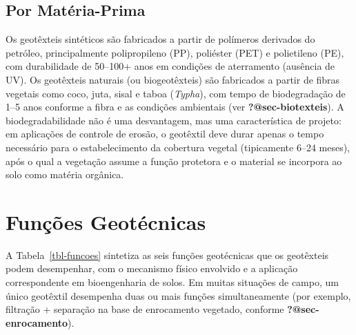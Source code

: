 \documentclass[
  portuguese,
  11pt,
  a4paper,
  open=any]{scrbook}
\begin{document}
\subsection{Por Matéria-Prima}\label{por-matuxe9ria-prima}

Os geotêxteis sintéticos são fabricados a partir de polímeros derivados
do petróleo, principalmente polipropileno (PP), poliéster (PET) e
polietileno (PE), com durabilidade de 50--100+ anos em condições de
aterramento (ausência de UV). Os geotêxteis naturais (ou biogeotêxteis)
são fabricados a partir de fibras vegetais como coco, juta, sisal e
taboa (\emph{Typha}), com tempo de biodegradação de 1--5 anos conforme a
fibra e as condições ambientais (ver \textbf{?@sec-biotexteis}). A
biodegradabilidade não é uma desvantagem, mas uma característica de
projeto: em aplicações de controle de erosão, o geotêxtil deve durar
apenas o tempo necessário para o estabelecimento da cobertura vegetal
(tipicamente 6--24 meses), após o qual a vegetação assume a função
protetora e o material se incorpora ao solo como matéria orgânica.

\section{Funções Geotécnicas}\label{funuxe7uxf5es-geotuxe9cnicas}

A Tabela~\ref{tbl-funcoes} sintetiza as seis funções geotécnicas que os
geotêxteis podem desempenhar, com o mecanismo físico envolvido e a
aplicação correspondente em bioengenharia de solos. Em muitas situações
de campo, um único geotêxtil desempenha duas ou mais funções
simultaneamente (por exemplo, filtração + separação na base de
enrocamento vegetado, conforme \textbf{?@sec-enrocamento}).
\end{document}
